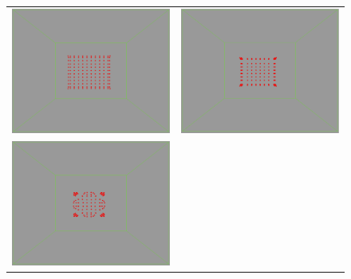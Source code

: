 \begin{figure}[htbp]
\begin{center}
\begin{tabular}{cc}
\includegraphics[scale= 0.15]{figures/coh1.pdf} &
\includegraphics[scale= 0.15]{figures/coh2.pdf} \\
\includegraphics[scale= 0.15]{figures/coh3.pdf} &

\end{tabular}
\end{center}
\end{figure}
